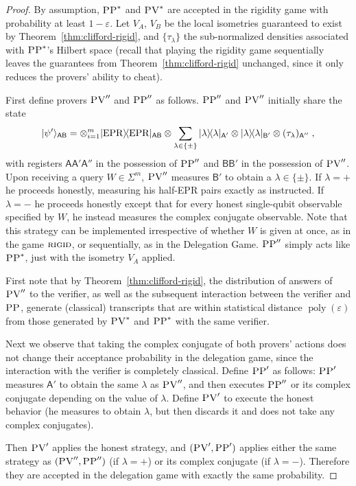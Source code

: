 \documentclass[11pt]{article}
\newcommand{\ket}[1]{|#1\rangle}
\newcommand{\bra}[1]{\langle#1|}
\newcommand{\proj}[1]{\ket{#1}\!\bra{#1}}
\DeclareMathOperator{\poly}{poly}
\newcommand{\reg}[1]{{\textsf{#1}}}
\newcommand{\eps}{\varepsilon}
\newcommand{\EPR}{{\rm EPR}}
\newcommand{\rigid}{\textsc{rigid}}
\newcommand{\pv}{\textsc{PV}}
\newcommand{\pp}{\textsc{PP}}
\begin{document}
\begin{proof}
By assumption, $\pp^*$ and $\pv^*$ are accepted in the rigidity game with
  probability at least $1-\eps$. Let $V_A$, $V_B$ be the local isometries
  guaranteed to exist by Theorem~\ref{thm:clifford-rigid}, and
  $\{\tau_\lambda\}$ the sub-normalized densities associated with $\pp^*$'s
  Hilbert space (recall that playing the rigidity game sequentially leaves the
  guarantees from Theorem~\ref{thm:clifford-rigid} unchanged, since it only reduces the provers' ability to cheat).

First define provers $\pv''$ and $\pp''$ as follows. $\pp''$ and $\pv''$ initially share the state 
$$\ket{\psi'}_{\reg{AB}} = \otimes_{i=1}^{m} \proj{\EPR}_{\reg{AB}} \otimes \sum_{\lambda\in\{\pm\}}  \proj{\lambda}_{\reg{A}'}\otimes \proj{\lambda}_{\reg{B}'}\otimes (\tau_\lambda)_{\reg{A}''}\;,$$
with registers $\reg{A}\reg{A}'\reg{A}''$ in the possession of $\pp''$ and $\reg{BB}'$ in the possession of $\pv''$. 
Upon receiving a query $W\in \Sigma^m$, $\pv''$ measures $\reg{B}'$ to obtain a $\lambda\in\{\pm\}$. If $\lambda=+$ he proceeds honestly, measuring his half-EPR pairs exactly as instructed. If $\lambda=-$ he proceeds honestly except that for every honest single-qubit observable specified by $W$, he instead measures the complex conjugate observable. Note that this strategy can be implemented irrespective of whether $W$ is given at once, as in the game $\rigid$, or sequentially, as in the Delegation Game. $\pp''$ simply acts like $\pp^*$, just with the isometry $V_A$ applied. 

First note that by Theorem~\ref{thm:clifford-rigid}, the distribution of answers of $\pv''$ to the verifier, as well as the subsequent interaction between the verifier and $\pp$, generate (classical) transcripts that are within statistical distance $\poly(\eps)$ from those generated by $\pv^*$ and $\pp^*$ with the same verifier. 

Next we observe that taking the complex conjugate of both provers' actions does not change their acceptance probability in the delegation game, since the interaction with the verifier is completely classical. Define $\pp'$ as follows: $\pp'$ measures $\reg{A}'$ to obtain the same $\lambda$ as $\pv''$, and then executes $\pp''$ or its complex conjugate depending on the value of $\lambda$. Define $\pv'$ to execute the honest behavior (he measures to obtain $\lambda$, but then discards it and does not take any complex conjugates). 

Then $\pv'$ applies the honest strategy, and $(\pv',\pp')$ applies either the same strategy as $(\pv'',\pp'')$ (if $\lambda=+$) or its complex conjugate (if $\lambda=-$). Therefore they are accepted in the delegation game with exactly the same probability. 
\end{proof}
\end{document}
